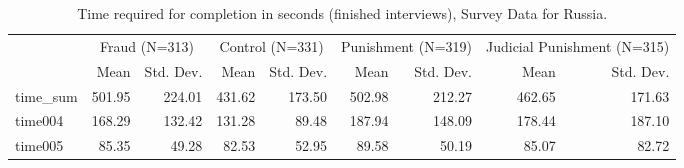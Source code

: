 \begin{table}

\caption{Time required for completion in seconds (finished interviews), Survey Data for Russia.}
\centering
\begin{tabular}[t]{lrrrrrrrr}
\toprule
\multicolumn{1}{c}{ } & \multicolumn{2}{c}{Fraud (N=313)} & \multicolumn{2}{c}{Control (N=331)} & \multicolumn{2}{c}{Punishment (N=319)} & \multicolumn{2}{c}{Judicial Punishment (N=315)} \\
\cmidrule(l{3pt}r{3pt}){2-3} \cmidrule(l{3pt}r{3pt}){4-5} \cmidrule(l{3pt}r{3pt}){6-7} \cmidrule(l{3pt}r{3pt}){8-9}
  & Mean & Std. Dev. & Mean & Std. Dev. & Mean & Std. Dev. & Mean & Std. Dev.\\
\midrule
time\_sum & 501.95 & 224.01 & 431.62 & 173.50 & 502.98 & 212.27 & 462.65 & 171.63\\
time004 & 168.29 & 132.42 & 131.28 & 89.48 & 187.94 & 148.09 & 178.44 & 187.10\\
time005 & 85.35 & 49.28 & 82.53 & 52.95 & 89.58 & 50.19 & 85.07 & 82.72\\
\bottomrule
\end{tabular}
\end{table}
